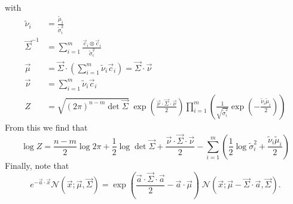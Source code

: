 \documentclass[11pt,twoside]{report}
\begin{document}
with
\begin{subequations}
\begin{align}
  \tilde{\nu}_i &= \frac{\tilde{\mu}_i}{\tilde{\sigma}_i^2} \\
  \vec{\Sigma}^{-1} &= \sum_{i=1}^m \frac{\vec{c}_i \otimes \vec{c}_i}{\tilde{\sigma}_i^2}
  \label{eq:combined-normals-sigma}
  \\
  \vec{\mu} &=
  \vec{\Sigma} \cdot \left( \sum_{i=1}^m \tilde{\nu}_i \vec{c}_i \right)
  = \vec{\Sigma} \cdot \vec{\nu}
  \\
  \vec{\nu} &= \sum_{i=1}^m \tilde{\nu}_i \vec{c}_i
  \label{eq:combined-normals-nu}
  \\
  Z &=
  \sqrt{ (2\pi)^{n-m} \det{\vec{\Sigma}} }
  \;
  \exp{\left( \frac{\vec{\nu} \cdot \vec{\Sigma} \cdot \vec{\nu}}{2} \right)}
  \prod_{i=1}^m
  \left(
  \frac{1}{\sqrt{ \tilde{\sigma}_i^2 }}
  \exp{\left(-\frac{\tilde{\nu}_i \tilde{\mu}_i}{2}\right)}
  \right)
  \label{eq:combined-normals-Z}
\end{align}
\end{subequations}
From this we find that
\begin{equation}
  \log{Z} =
  \frac{n-m}{2} \log{2\pi} +
  \frac{1}{2} \log\det{\vec{\Sigma}} +
  \frac{\vec{\nu} \cdot \vec{\Sigma} \cdot \vec{\nu}}{2} -
  \sum_{i=1}^m
  \left(
  \frac{1}{2} \log{\tilde{\sigma}_i^2} +
  \frac{\tilde{\nu}_i \tilde{\mu}_i}{2}
  \right)
\end{equation}
Finally, note that
\begin{equation}\label{eq:biased-normal}
  e^{-\vec{a} \cdot \vec{x}} \mathcal{N}(\vec{x}; \vec{\mu}, \vec{\Sigma})
  =
  \exp{\left( \frac{\vec{a} \cdot \vec{\Sigma} \cdot \vec{a}}{2} - \vec{a} \cdot \vec{\mu} \right)} \;
  \mathcal{N}(\vec{x}; \vec{\mu} - \vec{\Sigma}\cdot\vec{a}, \vec{\Sigma}).
\end{equation}
\end{document}
